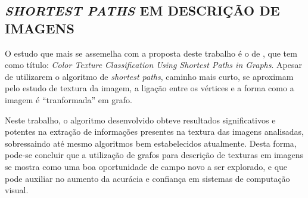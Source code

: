\subsection{\textit{SHORTEST PATHS} EM DESCRIÇÃO DE IMAGENS}
\label{subsec:trabalho-jarbas}

\par O estudo que mais se assemelha com a proposta deste trabalho é o de , que tem como título: \textit{Color Texture Classification Using Shortest Paths in Graphs}. Apesar de utilizarem o algoritmo de \textit{shortest paths}, caminho mais curto, se aproximam pelo estudo de textura da imagem, a ligação entre os vértices e a forma como a imagem é ``tranformada'' em grafo.

\par Neste trabalho, o algoritmo desenvolvido obteve resultados significativos e potentes na extração de informações presentes na textura das imagens analisadas, sobressaindo até mesmo algoritmos bem estabelecidos atualmente. Desta forma, pode-se concluir que a utilização de grafos para descrição de texturas em imagens se mostra como uma boa oportunidade de campo novo a ser explorado, e que pode auxiliar no aumento da acurácia e confiança em sistemas de computação visual.
